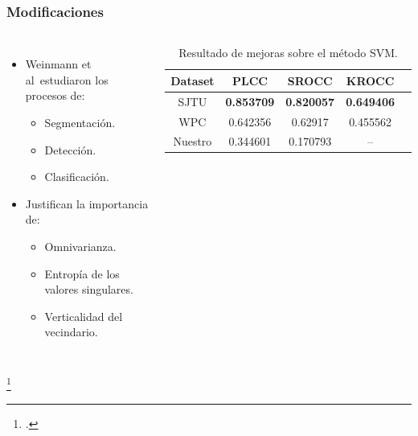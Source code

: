 \begin{frame}
  \frametitle{Modificaciones}
  \begin{columns}
    \begin{itemize}
      \item Weinmann et al\footnotemark ~estudiaron los procesos de: 
        \begin{itemize}
          \item Segmentación.
          \item Detección.
          \item Clasificación.
        \end{itemize}
      \item Justifican la importancia de:  
        \begin{itemize}
          \item Omnivarianza.
          \item Entropía de los valores singulares.
          \item Verticalidad del vecindario.
        \end{itemize}
    \end{itemize}
  \begin{table}[htp]
    \small
    \begin{center}
      \begin{tabular}[c]{|c|c|c|c|c|}
        \hline
        \rowcolor[HTML]{FFC702}
        \textbf{Dataset} & \textbf{PLCC} & \textbf{SROCC} & \textbf{KROCC} \\ 
        \hline
        SJTU & \textbf{0.853709} & \textbf{0.820057} & \textbf{0.649406} \\ 
        \hline 
        WPC & 0.642356 & 0.62917 & 0.455562 \\
        \hline 
        Nuestro & 0.344601 &  0.170793 & -- \\
        \hline
      \end{tabular}
    \end{center}
    \caption[Resultado de mejoras sobre el método SVM]{Resultado de mejoras sobre el método SVM.}
    \label{tab:ImprovNR3DQA}
  \end{table}
\end{columns}
\footcitetext{3DNSSMetrics}
\end{frame}


